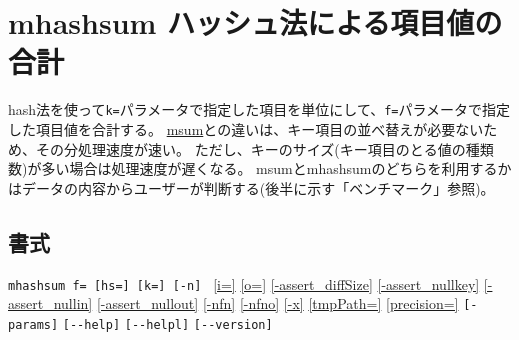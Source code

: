 
%

\section{mhashsum ハッシュ法による項目値の合計\label{sect:mhashsum}}
hash法を使って\verb|k=|パラメータで指定した項目を単位にして、\verb|f=|パラメータで指定した項目値を合計する。
\hyperref[sect:msum]{msum}との違いは、キー項目の並べ替えが必要ないため、その分処理速度が速い。
ただし、キーのサイズ(キー項目のとる値の種類数)が多い場合は処理速度が遅くなる。
msumとmhashsumのどちらを利用するかはデータの内容からユーザーが判断する(後半に示す「ベンチマーク」参照)。

\subsection*{書式}
\verb|mhashsum f= [hs=] [k=] [-n] |
\hyperref[sect:option_i]{[i=]}
\hyperref[sect:option_o]{[o=]}
\hyperref[sect:option_assert_diffSize]{[-assert\_diffSize]}
\hyperref[sect:option_assert_nullkey]{[-assert\_nullkey]}
\hyperref[sect:option_assert_nullin]{[-assert\_nullin]}
\hyperref[sect:option_assert_nullout]{[-assert\_nullout]}
\hyperref[sect:option_nfn]{[-nfn]} 
\hyperref[sect:option_nfno]{[-nfno]}  
\hyperref[sect:option_x]{[-x]}
\hyperref[sect:option_option_tmppath]{[tmpPath=]}
\hyperref[sect:option_precision]{[precision=]}
\verb|[-params]|
\verb|[--help]|
\verb|[--helpl]|
\verb|[--version]|\\

